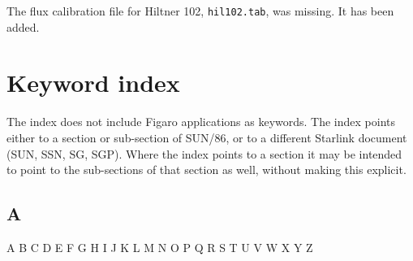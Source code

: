 \documentclass[11pt,twoside]{article}
\newcommand{\stardocinitials}  {SUN}
\newcommand{\stardocnumber}    { 86.21}
\newcommand{\stardocname}{\stardocinitials /\stardocnumber}
\newcommand{\htmlref}[2]{#1}
\newcommand{\xlabel}[1]{}
\begin{document}
 The flux calibration file for Hiltner 102, {\tt hil102.tab}, was missing.
 It has been added.



\sloppy\twocolumn
\section{\xlabel{keywords}\label{keywords}Keyword index}
\markboth{Index}{\stardocname}

   The index does not include Figaro applications as keywords.
   The index points either to a section or sub-section of SUN/86, or to
   a different Starlink document (SUN, SSN, SG, SGP). Where the index
   points to a section it may be intended to point to the sub-sections
   of that section as well, without making this explicit.

\small

\subsection*{\label{index_A}A}

\begin{htmlonly}
A
\htmlref{B}{index_B}
\htmlref{C}{index_C}
\htmlref{D}{index_D}
\htmlref{E}{index_E}
\htmlref{F}{index_F}
\htmlref{G}{index_G}
\htmlref{H}{index_H}
\htmlref{I}{index_I}
\htmlref{J}{index_J}
\htmlref{K}{index_K}
\htmlref{L}{index_L}
\htmlref{M}{index_M}
\htmlref{N}{index_N}
\htmlref{O}{index_O}
\htmlref{P}{index_P}
\htmlref{Q}{index_Q}
\htmlref{R}{index_R}
\htmlref{S}{index_S}
\htmlref{T}{index_T}
\htmlref{U}{index_U}
\htmlref{V}{index_V}
\htmlref{W}{index_W}
\htmlref{X}{index_X}
\htmlref{Y}{index_Y}
Z
\end{htmlonly}
\end{document}
